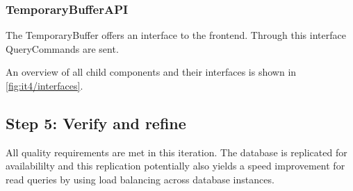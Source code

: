 \subsubsection{TemporaryBufferAPI}

\npar The TemporaryBuffer offers an  interface
to the frontend. Through this interface QueryCommands are sent.

\npar An overview of all child components and their interfaces is shown in
\ref{fig:it4/interfaces}.

\subsection{Step 5: Verify and refine}
\label{add:it4/verification}

\npar All quality requirements are met in this iteration. The database is
replicated for availabililty and this replication potentially also yields a
speed improvement for read queries by using load balancing across database
instances.
